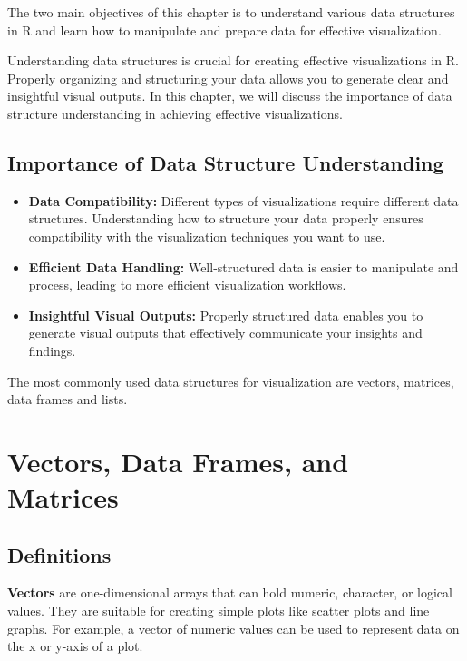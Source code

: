 \documentclass[
]{book}
\providecommand{\tightlist}{%
  \setlength{\itemsep}{0pt}\setlength{\parskip}{0pt}}
\begin{document}
The two main objectives of this chapter is to understand various data structures in R and learn how to manipulate and prepare data for effective visualization.

Understanding data structures is crucial for creating effective visualizations in R. Properly organizing and structuring your data allows you to generate clear and insightful visual outputs. In this chapter, we will discuss the importance of data structure understanding in achieving effective visualizations.

\subsection{Importance of Data Structure Understanding}\label{importance-of-data-structure-understanding}

\begin{itemize}
\tightlist
\item
  \textbf{Data Compatibility:} Different types of visualizations require different data structures. Understanding how to structure your data properly ensures compatibility with the visualization techniques you want to use.
\item
  \textbf{Efficient Data Handling:} Well-structured data is easier to manipulate and process, leading to more efficient visualization workflows.
\item
  \textbf{Insightful Visual Outputs:} Properly structured data enables you to generate visual outputs that effectively communicate your insights and findings.
\end{itemize}

The most commonly used data structures for visualization are vectors, matrices, data frames and lists.

\section{Vectors, Data Frames, and Matrices}\label{vectors-data-frames-and-matrices}

\subsection{Definitions}\label{definitions}

\textbf{Vectors} are one-dimensional arrays that can hold numeric, character, or logical values. They are suitable for creating simple plots like scatter plots and line graphs. For example, a vector of numeric values can be used to represent data on the x or y-axis of a plot.
\end{document}
